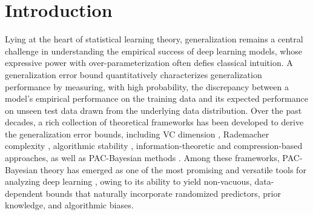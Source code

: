 \documentclass[journal]{IEEEtran} %
\begin{document}
\section{Introduction}
%
Lying at the heart of statistical learning theory, generalization remains a central challenge in understanding the empirical success of deep learning models, whose expressive power with over-parameterization often defies classical intuition. 
A generalization error bound quantitatively characterizes generalization performance by measuring, with high probability, the discrepancy between a model’s empirical performance on the training data and its expected performance on unseen test data drawn from the underlying data distribution.
Over the past decades, a rich collection of theoretical frameworks has been developed to derive the generalization error bounds, including VC dimension \cite{blumer1989learnability,vapnik2015uniform}, Rademacher complexity \cite{bartlett2002rademacher}, algorithmic stability \cite{bousquet2002stability,hardt2016train}, information-theoretic \cite{russo2016controlling,xu2017information} and compression-based \cite{arora2018stronger} approaches, as well as PAC-Bayesian methods \cite{mcallester1998some,mcallester1999pac,catoni2007pac}. 
%
Among these frameworks, PAC-Bayesian theory has emerged as one of the most promising and versatile tools for analyzing deep learning \cite{dziugaite2017computing,neyshabur2018pac,jin2020does,jin2022weight}, owing to its ability to yield non-vacuous, data-dependent bounds that naturally incorporate randomized predictors, prior knowledge, and algorithmic biases. 
% 
\end{document}
